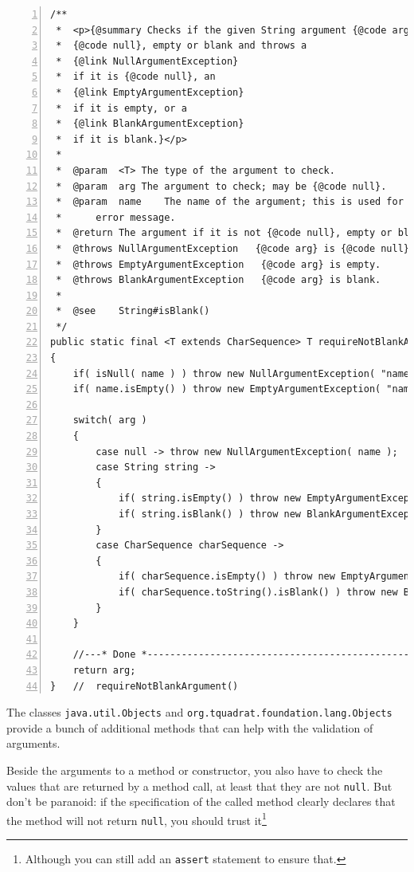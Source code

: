 \documentclass[11pt,a4paper, titlepage, parskip=half, headsepline, footsepline, cleardoublepage=current, headheight=1cm]{scrbook}
\begin{document}
\begin{lstlisting}[numbers=left,caption={requireNotBlankArgument()}]
/**
 *  <p>{@summary Checks if the given String argument {@code arg} is
 *  {@code null}, empty or blank and throws a
 *  {@link NullArgumentException}
 *  if it is {@code null}, an
 *  {@link EmptyArgumentException}
 *  if it is empty, or a
 *  {@link BlankArgumentException}
 *  if it is blank.}</p>
 *
 *  @param  <T> The type of the argument to check.
 *  @param  arg The argument to check; may be {@code null}.
 *  @param  name    The name of the argument; this is used for the
 *      error message.
 *  @return The argument if it is not {@code null}, empty or blank.
 *  @throws NullArgumentException   {@code arg} is {@code null}.
 *  @throws EmptyArgumentException   {@code arg} is empty.
 *  @throws BlankArgumentException   {@code arg} is blank.
 *
 *  @see    String#isBlank()
 */
public static final <T extends CharSequence> T requireNotBlankArgument( final T arg, final String name )
{
    if( isNull( name ) ) throw new NullArgumentException( "name" );
    if( name.isEmpty() ) throw new EmptyArgumentException( "name" );

    switch( arg )
    {
        case null -> throw new NullArgumentException( name );
        case String string ->
        {
            if( string.isEmpty() ) throw new EmptyArgumentException( name );
            if( string.isBlank() ) throw new BlankArgumentException( name );
        }
        case CharSequence charSequence ->
        {
            if( charSequence.isEmpty() ) throw new EmptyArgumentException( name );
            if( charSequence.toString().isBlank() ) throw new BlankArgumentException( name );
        }
    }

    //---* Done *----------------------------------------------------------
    return arg;
}   //  requireNotBlankArgument()
\end{lstlisting}

The classes \lstinline|java.util.Objects|\autocite{ORACLE_DOC_OBJECTS_CLASS} and \lstinline|org.tquadrat.foundation.lang.Objects|\autocite{TQUADRAT_ORG_FOUNDATION_OBJECTS} provide a bunch of additional methods that can help with the validation of arguments.

Beside the arguments to a method or constructor, you also have to check the values that are returned by a method call, at least that they are not \lstinline|null|. But don't be paranoid: if the specification of the called method clearly declares that the method will not return \lstinline|null|, you should trust it\footnote{Although you can still add an \lstinline|assert| statement to ensure that.}
\end{document}
